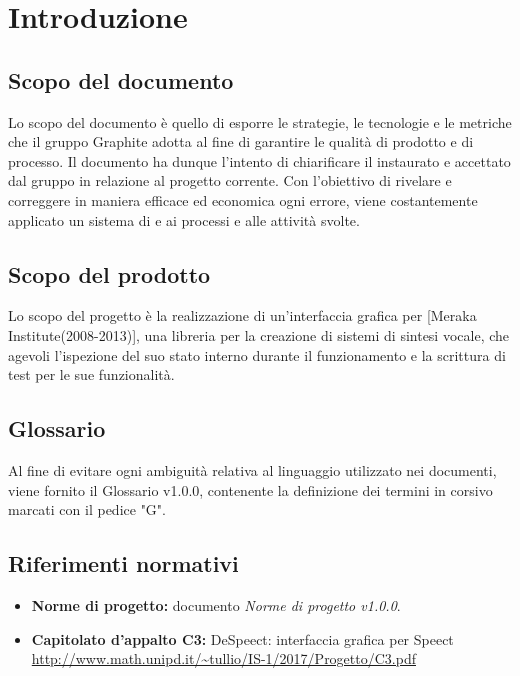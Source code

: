 \documentclass[openany,12pt,a4paper]{report}
\begin{document}

\chapter{Introduzione}

    \section{Scopo del documento}
    
    Lo scopo del documento è quello di esporre le strategie, le tecnologie e le metriche che il gruppo Graphite adotta al fine di garantire le qualità di prodotto e di processo. Il documento ha dunque l'intento di chiarificare il  instaurato e accettato dal gruppo in relazione al progetto corrente. Con l'obiettivo di rivelare e correggere in maniera efficace ed economica ogni errore, viene costantemente applicato un sistema di  e  ai processi e alle attività svolte.
    
    \section{Scopo del prodotto}
    
    Lo scopo del progetto è la realizzazione di un’interfaccia grafica per  [Meraka Institute(2008-2013)], una libreria per la creazione di sistemi di sintesi vocale, che agevoli l’ispezione del suo stato interno durante il funzionamento e la scrittura di test per le sue funzionalità.
    
    \section{Glossario}
    
    Al fine di evitare ogni ambiguità relativa al linguaggio utilizzato nei documenti, viene fornito il Glossario v1.0.0, contenente la definizione dei termini in corsivo marcati con il pedice "G".
    
    \section{Riferimenti normativi}
    
    \begin{itemize}
    
        \item \textbf{Norme di progetto:} documento \textit{Norme di progetto v1.0.0}.
        
        \item\textbf{Capitolato d'appalto C3:} DeSpeect: interfaccia grafica per Speect \\ \url{http://www.math.unipd.it/~tullio/IS-1/2017/Progetto/C3.pdf}
    
    \end{itemize}
    
\end{document}
